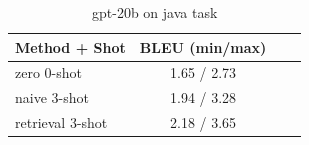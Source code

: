 \begin{table}[ht]
\centering
\small
\caption{gpt-20b on java task}
\begin{tabular}{lccc}
\hline
Method + Shot & BLEU (min/max) \\
\hline
zero 0-shot & 1.65 / 2.73 \\
naive 3-shot & 1.94 / 3.28 \\
retrieval 3-shot & 2.18 / 3.65 \\
\hline
\end{tabular}
\end{table}
